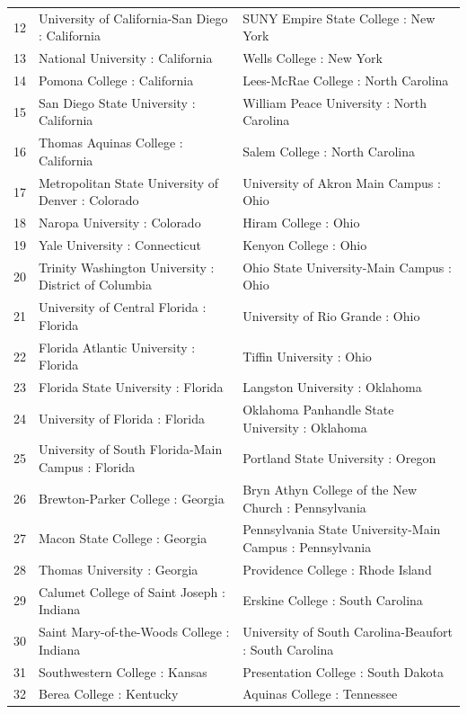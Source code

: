 \documentclass{article}
\begin{document}
\begin{Schunk}
\begin{table}[ht]
\begin{tabular}{rll}
  12 & University of California-San Diego : California & SUNY Empire State College : New York \\ 
  13 & National University : California & Wells College : New York \\ 
  14 & Pomona College : California & Lees-McRae College : North Carolina \\ 
  15 & San Diego State University : California & William Peace University : North Carolina \\ 
  16 & Thomas Aquinas College : California & Salem College : North Carolina \\ 
  17 & Metropolitan State University of Denver : Colorado & University of Akron Main Campus : Ohio \\ 
  18 & Naropa University : Colorado & Hiram College : Ohio \\ 
  19 & Yale University : Connecticut & Kenyon College : Ohio \\ 
  20 & Trinity Washington University : District of Columbia & Ohio State University-Main Campus : Ohio \\ 
  21 & University of Central Florida : Florida & University of Rio Grande : Ohio \\ 
  22 & Florida Atlantic University : Florida & Tiffin University : Ohio \\ 
  23 & Florida State University : Florida & Langston University : Oklahoma \\ 
  24 & University of Florida : Florida & Oklahoma Panhandle State University : Oklahoma \\ 
  25 & University of South Florida-Main Campus : Florida & Portland State University : Oregon \\ 
  26 & Brewton-Parker College : Georgia & Bryn Athyn College of the New Church : Pennsylvania \\ 
  27 & Macon State College : Georgia & Pennsylvania State University-Main Campus : Pennsylvania \\ 
  28 & Thomas University : Georgia & Providence College : Rhode Island \\ 
  29 & Calumet College of Saint Joseph : Indiana & Erskine College : South Carolina \\ 
  30 & Saint Mary-of-the-Woods College : Indiana & University of South Carolina-Beaufort : South Carolina \\ 
  31 & Southwestern College : Kansas & Presentation College : South Dakota \\ 
  32 & Berea College : Kentucky & Aquinas College : Tennessee \\ 

\end{tabular}
\end{table}
\end{Schunk}
\end{document}
